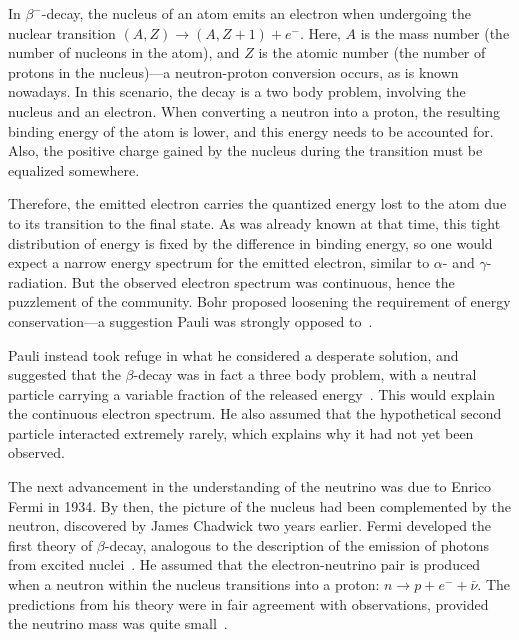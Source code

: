 In $\beta^-$-decay, the nucleus of an atom emits an electron when undergoing the nuclear transition $(A,Z)\rightarrow(A,Z+1) + e^-$. Here, $A$ is the mass number (the number of nucleons in the atom), and $Z$ is the atomic number (the number of protons in the nucleus)---a neutron-proton conversion occurs, as is known nowadays. In this scenario, the decay is a two body problem, involving the nucleus and an electron. When converting a neutron into a proton, the resulting binding energy of the atom is lower, and this energy needs to be accounted for. Also, the positive charge gained by the nucleus during the transition must be equalized somewhere.

Therefore, the emitted electron carries the quantized energy lost to the atom due to its transition to the final state. As was already known at that time, this tight distribution of energy is fixed by the difference in binding energy, so one would expect a narrow energy spectrum for the emitted electron, similar to $\alpha$- and $\gamma$-radiation. But the observed electron spectrum was continuous, hence the puzzlement of the community. Bohr proposed loosening the requirement of energy conservation---a suggestion Pauli was strongly opposed to~.

Pauli instead took refuge in what he considered a desperate solution, and suggested that the $\beta$-decay was in fact a three body problem, with a neutral particle carrying a variable fraction of the released energy~. This would explain the continuous electron spectrum. He also assumed that the hypothetical second particle interacted extremely rarely, which explains why it had not yet been observed.

The next advancement in the understanding of the neutrino was due to Enrico Fermi in 1934. By then, the picture of the nucleus had been complemented by the neutron, discovered by James Chadwick two years earlier. Fermi developed the first theory of $\beta$-decay, analogous to the description of the emission of photons from excited nuclei~\cite{Fermi1934}. He assumed that the electron-neutrino pair is produced when a neutron within the nucleus transitions into a proton: $n \rightarrow p + e^- + \bar{\nu}$. The predictions from his theory were in fair agreement with observations, provided the neutrino mass was quite small~\cite{Fermi1934}.

